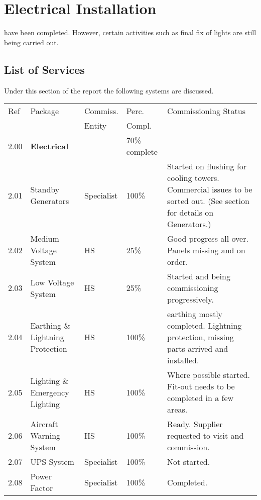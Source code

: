 \chapter{Electrical Installation}
\label{ch:electrical}

 have been completed. However, certain activities such as final fix of lights are still being carried out.  

\section{List of Services}
Under this section of the report the following systems are discussed.

\bgroup
\small
\label{chap:listofservices}

\begin{longtable}{llllp{3.9cm}}
\toprule
Ref	&Package	&Commiss.	&Perc. & Commissioning Status\\
     &         &Entity    &Compl.\\
\midrule
2.00	&\textbf{Electrical}		&& 70\% complete\\
2.01	&Standby Generators	&Specialist&100\% & Started on flushing for cooling towers. Commercial issues to be sorted out. (See section for details on Generators.)\\	
2.02	&Medium Voltage System	&HS&25\% & Good progress all over. Panels missing and on order.\\	
2.03	&Low Voltage System		&HS&25\% & Started and being commissioning progressively.\\
2.04	&Earthing \& Lightning Protection &HS&100\% &earthing mostly completed. Lightning protection, missing parts arrived and installed. \\		
2.05	&Lighting \& Emergency Lighting  &HS&100\% & Where possible started. Fit-out needs to be completed in a few areas.\\		
2.06	&Aircraft Warning System &HS&100\% & Ready. Supplier requested to visit and commission. \\		
2.07	&UPS System	&Specialist&100\% & Not started.\\	
2.08  &Power Factor  &Specialist &100\% & Completed.\\
\midrule
\end{longtable}
\egroup



